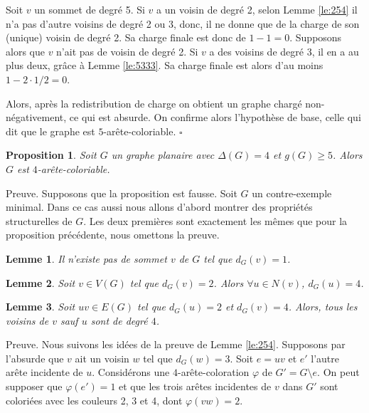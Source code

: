 \documentclass[10pt,a4paper]{article}
\newtheorem{proposition}{Proposition}
\newtheorem{lemme}{Lemme}
\newcommand{\ep}{{\hfill $\square$}}
\begin{document}
Soit $v$ un sommet de degré 5. Si $v$ a un voisin de degré 2, selon Lemme \ref{le:254} il n'a pas d'autre voisins de degré 2 ou 3, donc, il ne donne que de la charge de son (unique) voisin de degré 2. Sa charge finale est donc de $1-1=0$.
Supposons alors que $v$ n'ait pas de voisin de degré 2. Si $v$ a des voisins de degré 3, il en a au plus deux, grâce à Lemme \ref{le:5333}. Sa charge finale est alors d'au moins $1-2\cdot 1/2 = 0$. 

Alors, après la redistribution de charge on obtient un graphe chargé non-négativement, ce qui est absurde. On confirme alors l'hypothèse de base, celle qui dit que le graphe est $5$-arête-coloriable.
\ep



\begin{proposition}
Soit $G$ un graphe planaire avec $\Delta(G) = 4$ et $g(G) \geq 5$. Alors $G$ est $4$-arête-coloriable.
\label{prop:454}
\end{proposition}

Preuve. Supposons que la proposition est fausse. Soit $G$ un contre-exemple minimal. Dans ce cas aussi nous allons d'abord montrer des propriétés structurelles de $G$. Les deux premières sont exactement les mêmes que pour la proposition précédente, nous omettons la preuve.

\begin{lemme}
Il n'existe pas de sommet $v$ de $G$ tel que $d_G(v) = 1$.
\label{le:14}
\end{lemme}

\begin{lemme}
Soit $v \in V(G)$ tel que $d_G(v) = 2$. Alors $\forall u \in N(v)$, $d_G(u) = 4$.
\label{le:23}
\end{lemme} 


\begin{lemme}
Soit $uv \in E(G)$ tel que $d_G(u) = 2$ et $d_G(v) = 4$. Alors, tous les voisins de $v$ sauf $u$ sont de degré $4$.
\label{le:243}
\end{lemme}

Preuve. Nous suivons les idées de la preuve de Lemme \ref{le:254}.
Supposons par l'absurde que $v$ ait un voisin $w$ tel que $d_G(w) = 3$. Soit $e = uv$ et $e'$ l'autre arête incidente de $u$. Considérons une $4$-arête-coloration $\varphi$ de $G' = G \setminus e$. On peut supposer que $\varphi(e') = 1$ et que les trois arêtes incidentes de $v$ dans $G'$ sont coloriées avec les couleurs 2, 3 et 4, dont $\varphi(vw) = 2$.
\end{document}
